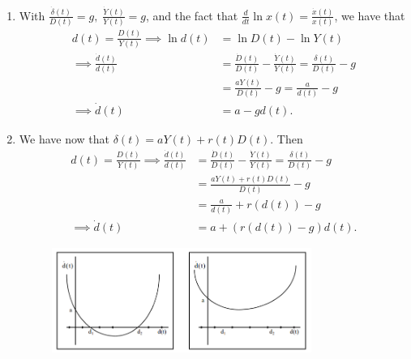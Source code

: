 \documentclass{article}
\newcommand{\?}{\textcolor{red}{(?)}} %
\begin{document}
        \renewcommand{\theenumi}{(\alph{enumi})}
        \renewcommand{\theenumii}{\roman{enumii}}
        \begin{enumerate}
            \item
            With $\frac{\dot \delta(t)}{D(t)} = g, \; \frac{\dot Y(t)}{Y(t)} = g$, and the fact that $\frac{d}{dt} \ln x(t) = \frac{\dot x(t)}{x(t)}$, we have that
            \begin{align}
                d(t) = \frac{D(t)}{Y(t)}
                \implies
                \ln d(t)
                &= \ln D(t) - \ln Y(t)
                \\
                \implies
                \frac{\dot d(t)}{d(t)}
                &= \frac{\dot D(t)}{D(t)} - \frac{\dot Y(t)}{Y(t)}
                = \frac{\delta(t)}{D(t)} - g
                \\
                &= \frac{aY(t)}{D(t)} - g
                = \frac{a}{d(t)} - g
                \\
                \implies
                \dot d(t)
                &= a - gd(t).
            \end{align}
            
            \item
            We have now that $\delta(t) = a Y(t) + r(t) D(t)$. Then
            \begin{align}
                d(t) = \frac{D(t)}{Y(t)}
                \implies
                \frac{\dot d(t)}{d(t)}
                &= \frac{\dot D(t)}{D(t)} - \frac{\dot Y(t)}{Y(t)}
                = \frac{\delta(t)}{D(t)} - g
                \\
                &= \frac{a Y(t) + r(t) D(t)}{D(t)} - g
                \\
                &= \frac{a}{d(t)} + r(d(t)) - g
                \\
                \implies
                \dot d(t) &= a + (r(d(t)) - g) d(t).
            \end{align}
            
            \begin{figure}[!ht]
                \centering
                \includegraphics[width=0.8\textwidth]{Homework/HW7/HW7_DR13.1-phase_diagram.png}
            \end{figure}
            
        \end{enumerate}
    
\end{document}
